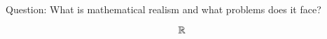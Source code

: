 \documentclass[11pt]{article}
\begin{document}
Question: What is mathematical realism and what problems does it face?

$$
\mathbb{R}
$$
\end{document}
